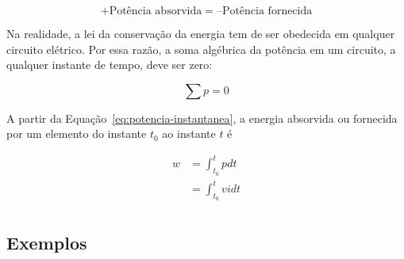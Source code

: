 \[
	+\text{Potência absorvida} = –\text{Potência fornecida}
\]

Na realidade, a lei da conservação da energia tem de ser obedecida em
qualquer circuito elétrico. Por essa razão, a soma algébrica da potência em um
circuito, a qualquer instante de tempo, deve ser zero:

\[
	\sum{p} = 0
\]

A partir da Equação~\ref{eq:potencia-instantanea}, a energia absorvida ou
fornecida por um elemento do instante \( t_0 \) ao instante \( t \) é

\begin{equation}
	\begin{aligned}
		\label{eq:energia}
		w & = \int_{t_0}^t p d t   \\
		  & = \int_{t_0}^t v i d t \\
	\end{aligned}
\end{equation}

\subsection{\textbf{Exemplos}}

